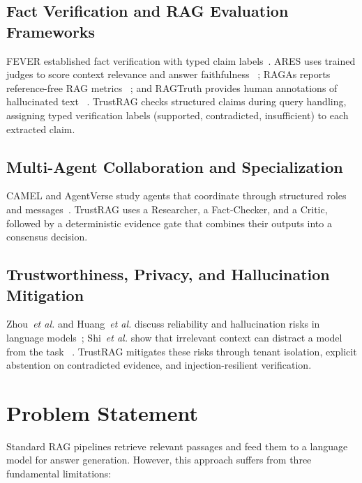 \documentclass[conference]{IEEEtran}
\begin{document}
\subsection{Fact Verification and RAG Evaluation Frameworks}
FEVER established fact verification with typed claim labels~\cite{thorne2018fever}.
ARES uses trained judges to score context relevance and answer faithfulness
~\cite{saadfalcon2024ares}; RAGAs reports reference-free RAG metrics
~\cite{es2024ragas}; and RAGTruth provides human annotations of hallucinated text
~\cite{niu2024ragtruth}. TrustRAG checks structured claims during query handling,
assigning typed verification labels (supported, contradicted, insufficient) to
each extracted claim.

\subsection{Multi-Agent Collaboration and Specialization}
CAMEL and AgentVerse study agents that coordinate through structured roles and
messages~\cite{li2023camel,chen2023agentverse}. TrustRAG uses a Researcher, a
Fact-Checker, and a Critic, followed by a deterministic evidence gate that
combines their outputs into a consensus decision.

\subsection{Trustworthiness, Privacy, and Hallucination Mitigation}
Zhou~\emph{et al.} and Huang~\emph{et al.} discuss reliability and hallucination
risks in language models~\cite{zhou2024trustworthy,huang2023hallucination}; Shi~\emph{et al.}
show that irrelevant context can distract a model from the task
~\cite{shi2023large}. TrustRAG mitigates these risks through tenant isolation,
explicit abstention on contradicted evidence, and injection-resilient verification.

\section{Problem Statement}
\label{sec:problem}

Standard RAG pipelines retrieve relevant passages and feed them to a language
model for answer generation. However, this approach suffers from three
fundamental limitations:
\end{document}
